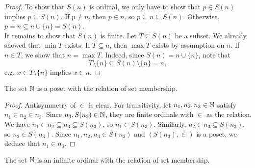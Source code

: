 \begin{proof}
    To show that $S(n)$ is ordinal, we only have to show that $p \in S(n)$ implies $p \subseteq S(n)$. If $p \neq n$, then $p \in n$, so $p \subseteq n \subseteq S(n)$. Otherwise, $p = n \subseteq n \cup \{n\} = S(n)$. 
    \\

    It remains to show that $S(n)$ is finite. Let $T \subseteq S(n)$ be a subset. We already showed that $\min T$ exists. If $T \subseteq n$, then $\max T$ exists by assumption on $n$. If $n \in T$, we show that $n = \max T$. Indeed, since $S(n) = n \cup \{n\}$, note that
    \[
        T \setminus \{n\} \subseteq S(n) \setminus \{n\} = n,
    \]
    e.g. $x \in T \setminus \{n\}$ implies $x \in n$.
\end{proof}

\begin{lemma} \label{naturals-form-a-poset}
    The set $\operatorname{\mathbb N}$ is a poset with the relation of set membership.
\end{lemma}

\begin{proof}
    Antisymmetry of $\in$ is clear. For transitivity, let $n_1, n_2, n_3 \in \operatorname{\mathbb N}$ satisfy $n_1 \in n_2 \in n_3$. Since $n_3, S(n_3) \in \operatorname{\mathbb N}$, they are finite ordinals with $\in$ as the relation. We have $n_1 \in n_2 \subseteq n_3 \subseteq S(n_3)$, so $n_1 \in S(n_3)$. Similarly, $n_2 \in n_3 \subseteq S(n_3)$, so $n_2 \in S(n_3)$. Since $n_1, n_2, n_3 \in S(n_3)$ and $(S(n_3), \in)$ is a poset, we deduce that $n_1 \in n_3$. 
\end{proof}

\begin{theorem} \label{well-ordering-of-the-naturals}
    The set $\operatorname{\mathbb N}$ is an infinite ordinal with the relation of set membership.
\end{theorem}

